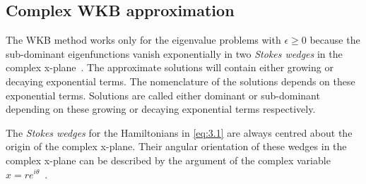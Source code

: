 \documentclass[12pt, a4paper]{report}
\begin{document}
\subsection{Complex WKB approximation}\label{WKB}
The WKB method works only for the eigenvalue problems with $\epsilon \geq 0$ because the sub-dominant eigenfunctions vanish exponentially in two \emph{Stokes wedges} in the complex x-plane~\cite{PTsymmetricQM}. The approximate solutions will contain either growing or decaying exponential terms. The nomenclature of the solutions depends on these exponential terms. Solutions are called either dominant or sub-dominant depending on these growing or decaying exponential terms respectively. 

The \emph{Stokes wedges} for the Hamiltonians in \ref{eq:3.1} are always centred about the origin of the complex x-plane. Their angular orientation of these wedges in the complex x-plane can be described by the argument of the complex variable $x = re^{i\theta}$~\cite{Scatteringoff}.
\end{document}

